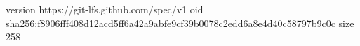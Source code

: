 version https://git-lfs.github.com/spec/v1
oid sha256:f8906fff408d12acd5ff6a42a9abfe9cf39b0078c2edd6a8e4d40c58797b9c0c
size 258
